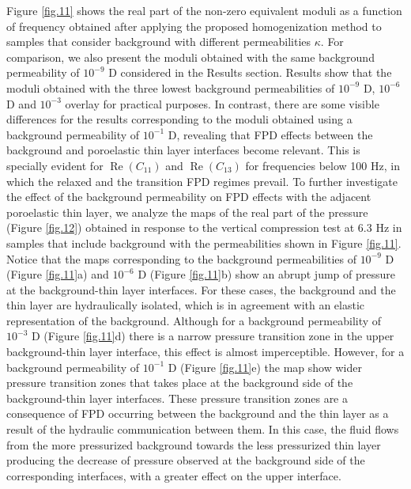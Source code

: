 \documentclass[draft]{agujournal2019}
\renewcommand{\Re}{\operatorname{Re} }
\begin{document}
Figure \ref{fig.11} shows the real part of the non-zero equivalent moduli as a function of frequency obtained after applying the proposed homogenization method to samples that consider background with different permeabilities $\kappa$. For comparison, we also present the moduli obtained with the same background permeability of $10^{-9}$ D considered in the Results section.
Results show that the moduli obtained with the three lowest background permeabilities of $10^{-9}$ D, $10^{-6}$ D and $10^{-3}$ overlay for practical purposes. In contrast, there are some visible differences for the results corresponding to the moduli obtained using a background permeability of $10^{-1}$ D, revealing that FPD effects between the background and poroelastic thin layer interfaces become relevant. This is specially evident for $\Re(C_{11})$ and $\Re(C_{13})$ for frequencies below 100 Hz, in which the relaxed and the transition FPD regimes prevail. To further investigate the effect of the background permeability on FPD effects with the adjacent poroelastic thin layer, we analyze the maps of the real part of the pressure (Figure \ref{fig.12}) obtained in response to the vertical compression test at 6.3 Hz in samples that include background with the permeabilities shown in Figure \ref{fig.11}.
Notice that the maps corresponding to the background permeabilities of $10^{-9}$ D (Figure \ref{fig.11}a) and $10^{-6}$ D (Figure \ref{fig.11}b) show an abrupt jump of pressure at the background-thin layer interfaces. For these cases, the background and the thin layer are hydraulically isolated, which is in agreement with an elastic representation of the background.
Although for a background permeability of  $10^{-3}$ D (Figure \ref{fig.11}d) there is 
a narrow pressure transition zone in the  upper background-thin layer interface, this effect is almost imperceptible.
However, for a background permeability of  $10^{-1}$ D (Figure \ref{fig.11}e) the map show  wider pressure transition zones that takes place at the background side of the background-thin layer interfaces.
These pressure transition zones are a consequence of FPD occurring between the background and the thin layer as a result of the hydraulic communication between them. In this case, the fluid flows from the more pressurized background towards the less pressurized thin layer producing the decrease of pressure observed at the background side of the corresponding interfaces, with a greater effect on the upper interface. 
\end{document}
